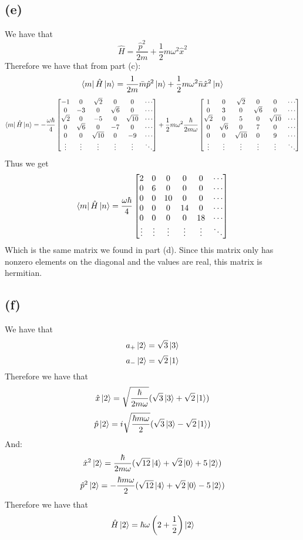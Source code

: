 \documentclass[11pt]{article}
\begin{document}
\subsection*{(e)}
We have that
$$\hat{H}=\frac{\hat{p}^2}{2m}+\frac{1}{2}
m\omega^2\hat{x}^2$$
Therefore we have that from part (c):
$$\bra{m}\hat{H}\ket{n}=
\frac{1}{2m}\bar{m}\hat{p}^2\ket{n}+
\frac{1}{2}m\omega^2\bar{n}\hat{x}^2\ket{n}$$
$$\bra{m}\hat{H}\ket{n}=-\frac{\omega\hbar}{4}
\begin{bmatrix}
    -1 & 0 & \sqrt{2} & 0 & 0 & \cdots \\
    0 & -3 & 0 & \sqrt{6} & 0 & \cdots \\
    \sqrt{2} & 0 & -5 & 0 & \sqrt{10} & \cdots \\
    0 & \sqrt{6} & 0 & -7 & 0 & \cdots \\
    0 & 0 & \sqrt{10} & 0 & -9 & \cdots \\
    \vdots & \vdots & \vdots & \vdots & \vdots & \ddots
\end{bmatrix}
+\frac{1}{2}m\omega^2\frac{\hbar}{2m\omega}
\begin{bmatrix}
    1 & 0 & \sqrt{2} & 0 & 0 & \cdots \\
    0 & 3 & 0 & \sqrt{6} & 0 & \cdots \\
    \sqrt{2} & 0 & 5 & 0 & \sqrt{10} & \cdots \\
    0 & \sqrt{6} & 0 & 7 & 0 & \cdots \\
    0 & 0 & \sqrt{10} & 0 & 9 & \cdots \\
    \vdots & \vdots & \vdots & \vdots & \vdots & \ddots
\end{bmatrix}
$$
Thus we get 
$$
\bra{m}\hat{H}\ket{n}
=\frac{\omega\hbar}{4}
\begin{bmatrix}
    2 & 0 & 0 & 0 & 0 & \cdots \\
    0 & 6 & 0 & 0 & 0 & \cdots \\
    0 & 0 & 10 & 0 & 0 & \cdots \\
    0 & 0 & 0 & 14 & 0 & \cdots \\
    0 & 0 & 0 & 0 & 18 & \cdots \\
    \vdots & \vdots & \vdots & \vdots & \vdots & \ddots
\end{bmatrix}$$
Which is the same matrix we found in part (d). Since this 
matrix only has nonzero elements on the diagonal and the
values are real, this matrix is hermitian.
\subsection*{(f)}
We have that 
$$a_{+}\ket{2}=\sqrt{3}\ket{3}$$
$$a_{-}\ket{2}=\sqrt{2}\ket{1}$$
Therefore we have that 
$$\hat{x}\ket{2}=\sqrt{\frac{\hbar}{2m\omega}}(\sqrt{3}\ket{3}+\sqrt{2}\ket{1})$$
$$\hat{p}\ket{2}=i\sqrt{\frac{\hbar m\omega}{2}}(\sqrt{3}\ket{3}-\sqrt{2}\ket{1})$$
And:
$$\hat{x}^2\ket{2}=\frac{\hbar}{2m\omega}(\sqrt{12}\ket{4}
+\sqrt{2}\ket{0}+5\ket{2})$$
$$\hat{p}^2\ket{2}=-\frac{\hbar m\omega}{2}(\sqrt{12}\ket{4}
+\sqrt{2}\ket{0}-5\ket{2})$$
Therefore we have that 
$$\hat{H}\ket{2}=
\hbar\omega\left(2+\frac{1}{2}\right)\ket{2}$$
\end{document}
